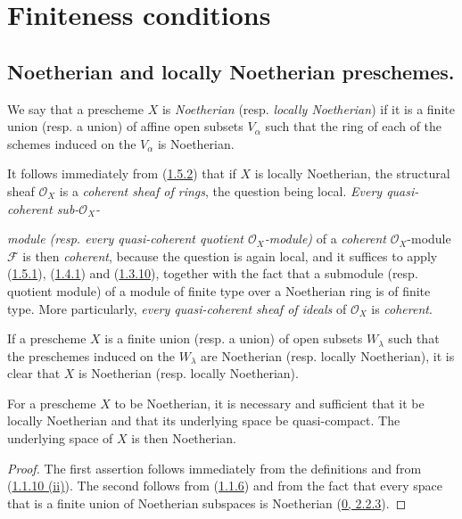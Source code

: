 \section{Finiteness conditions}
\label{section:I.6}

\subsection{Noetherian and locally Noetherian preschemes.}
\label{subsection:I.6.1}

\begin{definition}[6.1.1]
\label{I.6.1.1}
We say that a prescheme $X$ is \emph{Noetherian} (resp. \emph{locally
Noetherian}) if it is a finite union (resp. a union) of affine open subsets
$V_\alpha$ such that the ring of each of the schemes induced on the $V_\alpha$
is Noetherian.
\end{definition}

It follows immediately from (\hyperref[I.1.5.2]{1.5.2}) that if $X$ is
locally Noetherian, the structural sheaf $\mathscr{O}_X$ is a
\emph{coherent sheaf of rings}, the question being local. \emph{Every
quasi-coherent sub-$\mathscr{O}_X$-}

\emph{module (resp. every quasi-coherent quotient $\mathscr{O}_X$-module)}
of a \emph{coherent} $\mathscr{O}_X$-module $\mathscr{F}$ is then
\emph{coherent}, because the question is again local, and it suffices
to apply (\hyperref[I.1.5.1]{1.5.1}),
(\hyperref[I.1.4.1]{1.4.1}) and
(\hyperref[I.1.3.10]{1.3.10}), together with the fact that a submodule
(resp. quotient module) of a module of finite type over a Noetherian ring is
of finite type. More particularly, \emph{every quasi-coherent sheaf of
ideals} of $\mathscr{O}_X$ is \emph{coherent}.

If a prescheme $X$ is a finite union (resp. a union) of open subsets
$W_\lambda$ such that the preschemes induced on the $W_\lambda$ are
Noetherian (resp. locally Noetherian), it is clear that $X$ is Noetherian
(resp. locally Noetherian).

\begin{proposition}[6.1.2]
\label{I.6.1.2}
For a prescheme $X$ to be Noetherian, it is necessary and sufficient that it
be locally Noetherian and that its underlying space be quasi-compact.
The underlying space of $X$ is then Noetherian.
\end{proposition}

\begin{proof}
The first assertion follows immediately from the definitions and from
(\hyperref[I.1.1.10]{1.1.10 (ii)}). The second follows from
(\hyperref[I.1.1.6]{1.1.6}) and from the fact that every space that is a
finite union of Noetherian subspaces is Noetherian
(\hyperref[0.2.2.3]{0, 2.2.3}).
\end{proof}

